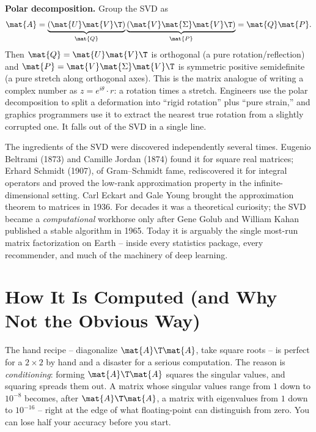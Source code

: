 \begin{connectionbox}
\textbf{Polar decomposition.} Group the SVD as
\[
  \mat{A} = \underbrace{(\mat{U}\mat{V}\T)}_{\mat{Q}}
            \underbrace{(\mat{V}\mat{\Sigma}\mat{V}\T)}_{\mat{P}} = \mat{Q}\mat{P}.
\]
Then $\mat{Q} = \mat{U}\mat{V}\T$ is orthogonal (a pure rotation/reflection) and
$\mat{P} = \mat{V}\mat{\Sigma}\mat{V}\T$ is symmetric positive semidefinite (a
pure stretch along orthogonal axes). This is the matrix analogue of writing a
complex number as $z = e^{i\theta}\cdot r$: a rotation times a stretch. Engineers
use the polar decomposition to split a deformation into ``rigid rotation'' plus
``pure strain,'' and graphics programmers use it to extract the nearest true
rotation from a slightly corrupted one. It falls out of the SVD in a single line.
\end{connectionbox}

\begin{historybox}
The ingredients of the SVD were discovered independently several times. Eugenio
Beltrami (1873) and Camille Jordan (1874) found it for square real matrices;
Erhard Schmidt (1907), of Gram--Schmidt fame, rediscovered it for integral
operators and proved the low-rank approximation property in the infinite-dimensional
setting. Carl Eckart and Gale Young brought the approximation theorem to matrices
in 1936. For decades it was a theoretical curiosity; the SVD became a
\emph{computational} workhorse only after Gene Golub and William Kahan published a
stable algorithm in 1965. Today it is arguably the single most-run matrix
factorization on Earth -- inside every statistics package, every recommender, and
much of the machinery of deep learning.
\end{historybox}

\section{How It Is Computed (and Why Not the Obvious Way)}
\label{ch29:computation}

The hand recipe -- diagonalize $\mat{A}\T\mat{A}$, take square roots -- is perfect
for a $2\times 2$ by hand and a disaster for a serious computation. The reason is
\emph{conditioning}: forming $\mat{A}\T\mat{A}$ squares the singular values, and
squaring spreads them out. A matrix whose singular values range from $1$ down to
$10^{-8}$ becomes, after $\mat{A}\T\mat{A}$, a matrix with eigenvalues from $1$
down to $10^{-16}$ -- right at the edge of what floating-point can distinguish from
zero. You can lose half your accuracy before you start.

